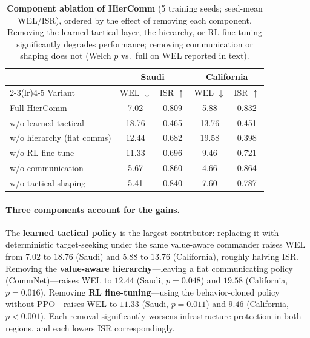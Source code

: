 \documentclass[letterpaper]{article}
\begin{document}
\begin{table}[t]
\centering
\caption{\textbf{Component ablation of HierComm} (5 training seeds; seed-mean WEL/ISR), ordered by the effect of removing each component. Removing the learned tactical layer, the hierarchy, or RL fine-tuning significantly degrades performance; removing communication or shaping does not (Welch $p$ vs.\ full on WEL reported in text).}
\label{tab:ablation}
\vspace{0.5em}
\setlength{\tabcolsep}{4pt}\small
\begin{tabular}{lcccc}
\toprule
 & \multicolumn{2}{c}{Saudi} & \multicolumn{2}{c}{California} \\
\cmidrule(lr){2-3}\cmidrule(lr){4-5}
Variant & WEL $\downarrow$ & ISR $\uparrow$ & WEL $\downarrow$ & ISR $\uparrow$ \\
\midrule
Full HierComm & 7.02 & 0.809 & 5.88 & 0.832 \\
w/o learned tactical & 18.76 & 0.465 & 13.76 & 0.451 \\
w/o hierarchy (flat comms) & 12.44 & 0.682 & 19.58 & 0.398 \\
w/o RL fine-tune & 11.33 & 0.696 & 9.46 & 0.721 \\
w/o communication & 5.67 & 0.860 & 4.66 & 0.864 \\
w/o tactical shaping & 5.41 & 0.840 & 7.60 & 0.787 \\
\bottomrule
\end{tabular}
\end{table}

\paragraph{Three components account for the gains.}
The \textbf{learned tactical policy} is the largest contributor: replacing it with deterministic target-seeking under the same value-aware commander raises WEL from $7.02$ to $18.76$ (Saudi) and $5.88$ to $13.76$ (California), roughly halving ISR. Removing the \textbf{value-aware hierarchy}---leaving a flat communicating policy (CommNet)---raises WEL to $12.44$ (Saudi, $p=0.048$) and $19.58$ (California, $p=0.016$). Removing \textbf{RL fine-tuning}---using the behavior-cloned policy without PPO---raises WEL to $11.33$ (Saudi, $p=0.011$) and $9.46$ (California, $p<0.001$). Each removal significantly worsens infrastructure protection in both regions, and each lowers ISR correspondingly.
\end{document}
